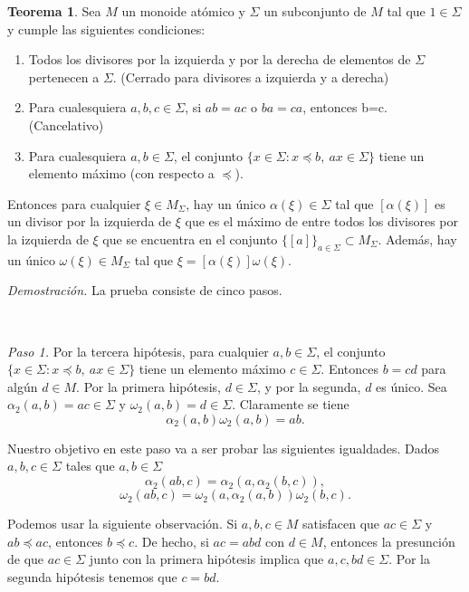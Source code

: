 \documentclass[12pt]{article}
\theoremstyle{definition}
\newtheorem{teor}{Teorema}[section]
\begin{document}
\begin{teor}
\label{teor:monoi_deriv}
Sea $M$ un monoide atómico y $\Sigma$ un subconjunto de $M$ tal que $1\in \Sigma$ y cumple las siguientes condiciones:
\begin{enumerate}
\item Todos los divisores por la izquierda y por la derecha de elementos de $\Sigma$ pertenecen a $\Sigma$. (Cerrado para divisores a izquierda y a derecha)
\item Para cualesquiera $a,b,c\in \Sigma$, si $ab=ac$ o $ba=ca$, entonces b=c. (Cancelativo)
\item Para cualesquiera $a,b\in \Sigma$, el conjunto $\{x\in\Sigma:x\preceq b,\ ax\in\Sigma\}$ tiene un elemento máximo (con respecto a $\preceq$).
\end{enumerate}
Entonces para cualquier $\xi\in M_\Sigma$, hay un único $\alpha(\xi)\in\Sigma$ tal que $[\alpha(\xi)]$ es un divisor por la izquierda de $\xi$ que es el máximo de entre todos los divisores por la izquierda de $\xi$ que se encuentra en el conjunto $\{[a]\}_{a\in\Sigma}\subset M_\Sigma$. Además, hay un único $\omega(\xi)\in M_\Sigma$ tal que $\xi=[\alpha(\xi)]\omega(\xi)$.
\end{teor}

\textit{Demostración.} La prueba consiste de cinco pasos.

\ 

\textit{Paso 1.} Por la tercera hipótesis, para cualquier $a,b\in\Sigma$, el conjunto $\{x\in\Sigma:x\preceq b,\ ax\in\Sigma\}$ tiene un elemento máximo $c\in\Sigma$. Entonces $b=cd$ para algún $d\in M$. Por la primera hipótesis, $d\in\Sigma$, y por la segunda, $d$ es único. Sea $\alpha_2(a,b)=ac\in\Sigma$ y $\omega_2(a,b)=d\in\Sigma$. Claramente se tiene
\begin{equation}
\label{eq:div_max}
\alpha_2(a,b)\omega_2(a,b)=ab.
\end{equation}

Nuestro objetivo en este paso va a ser probar las siguientes igualdades. Dados $a,b,c\in\Sigma$ tales que $a,b\in\Sigma$
\begin{equation}
\label{eq:alfa_com}
\alpha_2(ab,c)=\alpha_2(a,\alpha_2(b,c)),
\end{equation}
\begin{equation}
\label{eq:omega_com}
\omega_2(ab,c)=\omega_2(a,\alpha_2(a,b))\omega_2(b,c).
\end{equation}

Podemos usar la siguiente observación. Si $a,b,c\in M$ satisfacen que $ac\in\Sigma$ y $ab\preceq ac$, entonces $b\preceq c$. De hecho, si $ac=abd$ con $d\in M$, entonces la presunción de que $ac\in\Sigma$ junto con la primera hipótesis implica que $a,c,bd\in\Sigma$. Por la segunda hipótesis tenemos que $c=bd$.
\end{document}
